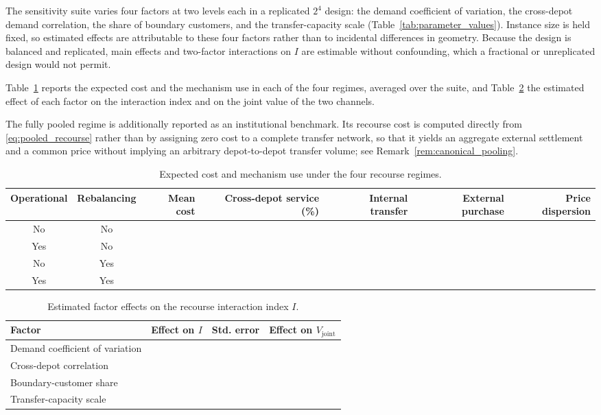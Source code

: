 \documentclass[authoryear,final,3p,times]{elsarticle}
\theoremstyle{definition}
\theoremstyle{plain}
\begin{document}
The sensitivity suite varies four factors at two levels each in a replicated
$2^4$ design: the demand coefficient of variation, the cross-depot demand
correlation, the share of boundary customers, and the transfer-capacity scale
(Table~\ref{tab:parameter_values}).  Instance size is held fixed, so estimated
effects are attributable to these four factors rather than to incidental
differences in geometry.  Because the design is balanced and replicated, main
effects and two-factor interactions on $I$ are estimable without confounding,
which a fractional or unreplicated design would not permit.

Table~\ref{tab:e4_interaction} reports the expected cost and the mechanism
use in each of the four regimes, averaged over the suite, and
Table~\ref{tab:e4_effects} the estimated effect of each factor on the
interaction index and on the joint value of the two channels.

The fully pooled regime is additionally reported as an institutional
benchmark.  Its recourse cost is computed directly from
\eqref{eq:pooled_recourse} rather than by assigning zero cost to a complete
transfer network, so that it yields an aggregate external settlement and a common
price without implying an arbitrary depot-to-depot transfer volume; see
Remark~\ref{rem:canonical_pooling}.

\begin{table}[!htbp]
\centering
\caption{Expected cost and mechanism use under the four recourse regimes.}
\label{tab:e4_interaction}
\begin{tabular}{ccrrrrr}
\toprule
Operational & Rebalancing & Mean cost & Cross-depot service (\%) & Internal transfer & External purchase & Price dispersion\\
\midrule
No  & No  & & & & & \\
Yes & No  & & & & & \\
No  & Yes & & & & & \\
Yes & Yes & & & & & \\
\bottomrule
\end{tabular}
\end{table}

\begin{table}[!htbp]
\centering
\caption{Estimated factor effects on the recourse interaction index $I$.}
\label{tab:e4_effects}
\begin{tabular}{lrrr}
\toprule
Factor & Effect on $I$ & Std. error & Effect on $V_{\mathrm{joint}}$\\
\midrule
Demand coefficient of variation & & & \\
Cross-depot correlation         & & & \\
Boundary-customer share         & & & \\
Transfer-capacity scale         & & & \\
\bottomrule
\end{tabular}
\end{table}
\end{document}
